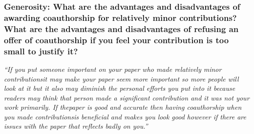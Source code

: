 \documentclass[12pt]{beamer}
\newcommand\ans[1]{{\it ``#1''}}
\begin{document}
\begin{frame} %
  \frametitle{Generosity: What are the advantages and disadvantages of awarding coauthorship for relatively minor contributions? What are the advantages and disadvantages of refusing an offer of coauthorship if you feel your contribution is too small to justify it?}

  \ans{If you put someone important on your paper who made relatively minor contributionsit may make your paper seem more important so more people will look at it but it also may diminish the personal efforts you put into it because readers may think that person  made  a  significant  contribution  and  it  was  not  your  work  primarily.   If  thepaper is good and accurate then having coauthorship when you made contributionsis beneficial and makes you look good however if there are issues with the paper that reflects badly on you.}

\end{frame}
\end{document}
